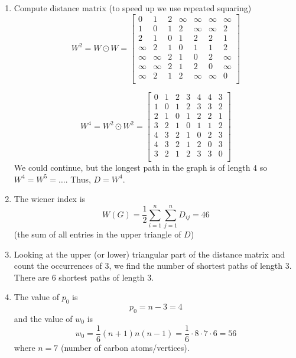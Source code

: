 \documentclass{article}
\renewcommand{\inf}{\infty}
\begin{document}
\begin{enumerate}[label = (\arabic*)]
	\item Compute distance matrix (to speed up we use repeated squaring)
	\[
		W^2 = W \odot W = 
		\begin{bmatrix}
		0 & 1 & 2 & \inf & \inf & \inf & \inf \\
		1 & 0 & 1 & 2 & \inf & \inf & 2 \\
		2 & 1 & 0 & 1 & 2 & 2 & 1 \\
		\inf & 2 & 1 & 0 & 1 & 1 & 2 \\
		\inf & \inf & 2 & 1 & 0 & 2 & \inf \\
		\inf & \inf & 2 & 1 & 2 & 0 & \inf \\
		\inf & 2 & 1 & 2 & \inf & \inf & 0 \\
		\end{bmatrix}
	\]	

	\[
		W^4 = W^2 \odot W^2 = 
		\begin{bmatrix}
		0 & 1 & 2 & 3 & 4 & 4 & 3 \\
		1 & 0 & 1 & 2 & 3 & 3 & 2 \\
		2 & 1 & 0 & 1 & 2 & 2 & 1 \\
		3 & 2 & 1 & 0 & 1 & 1 & 2 \\
		4 & 3 & 2 & 1 & 0 & 2 & 3 \\
		4 & 3 & 2 & 1 & 2 & 0 & 3 \\
		3 & 2 & 1 & 2 & 3 & 3 & 0 \\
		\end{bmatrix}
	\]
	We could continue, but the longest path in the graph is of length $4$ so $W^4 = W^5 = \dots$. Thus, $D = W^4$.
	
	
	\item The wiener index is 
	\[
		W(G) = \frac{1}{2}\sum_{i=1}^{n}\sum_{j=1}^{n} D_{ij} = 46 
	\]
	(the sum of all entries in the upper triangle of $D$)
	
	\item Looking at the upper (or lower) triangular part of the distance matrix and count the occurrences of $3$, we find the number of shortest paths of length $3$. \\
	
	There are $6$ shortest paths of length $3$. 
	
	\item The value of $p_0$ is 
	\[
		p_0 = n - 3 = 4
	\]
	and the value of $w_0$ is 
	\[
		w_0 = \frac{1}{6}(n+1)n(n-1) = \frac{1}{6}\cdot 8\cdot 7\cdot 6 = 56
	\]
	where $n=7$ (number of carbon atoms/vertices). 
	

\end{enumerate}
\end{document}
